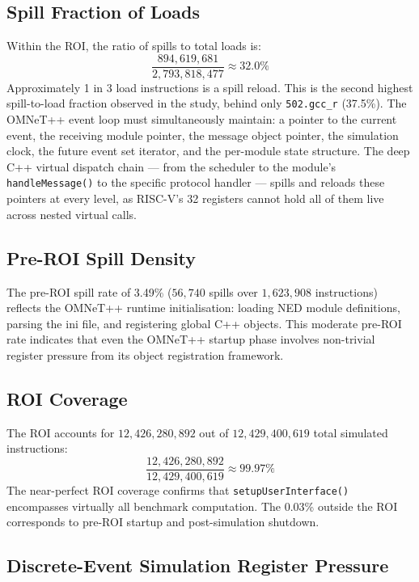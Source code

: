 \documentclass[conference]{IEEEtran}
\begin{document}
\subsection{Spill Fraction of Loads}

Within the ROI, the ratio of spills to total loads is:
\[
\frac{894{,}619{,}681}{2{,}793{,}818{,}477} \approx 32.0\%
\]
Approximately 1 in 3 load instructions is a spill reload. This is
the second highest spill-to-load fraction observed in the study,
behind only \texttt{502.gcc\_r} (37.5\%). The OMNeT++ event loop
must simultaneously maintain: a pointer to the current event, the
receiving module pointer, the message object pointer, the simulation
clock, the future event set iterator, and the per-module state
structure. The deep C++ virtual dispatch chain --- from the scheduler
to the module's \texttt{handleMessage()} to the specific protocol
handler --- spills and reloads these pointers at every level,
as RISC-V's 32 registers cannot hold all of them live across
nested virtual calls.

\subsection{Pre-ROI Spill Density}

The pre-ROI spill rate of 3.49\% ($56{,}740$ spills over
$1{,}623{,}908$ instructions) reflects the OMNeT++ runtime
initialisation: loading NED module definitions, parsing the ini
file, and registering global C++ objects. This moderate pre-ROI
rate indicates that even the OMNeT++ startup phase involves
non-trivial register pressure from its object registration framework.

\subsection{ROI Coverage}

The ROI accounts for $12{,}426{,}280{,}892$ out of $12{,}429{,}400{,}619$
total simulated instructions:
\[
\frac{12{,}426{,}280{,}892}{12{,}429{,}400{,}619} \approx 99.97\%
\]
The near-perfect ROI coverage confirms that
\texttt{setupUserInterface()} encompasses virtually all benchmark
computation. The 0.03\% outside the ROI corresponds to
pre-ROI startup and post-simulation shutdown.

\subsection{Discrete-Event Simulation Register Pressure}
\end{document}
